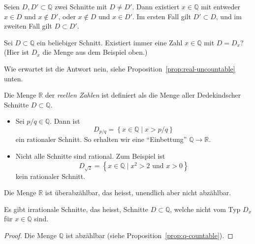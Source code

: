 \documentclass[../main.tex]{subfiles}
\begin{document}
\begin{remark}
  Seien $D, D' \subset \mathbb Q$ zwei Schnitte mit $D \neq D'$.
  Dann existiert $x \in \mathbb Q$ mit entweder $x \in D$ und $x \notin D'$,
  oder $x \notin D$ und $x \in D'$.
  Im ersten Fall gilt $D' \subset D$, und im zweiten Fall gilt $D \subset D'$.
\end{remark}

\begin{question}
  Sei $D \subset \mathbb Q$ ein beliebiger Schnitt. Existiert immer
  eine Zahl $x \in \mathbb Q$ mit $D = D_{x}$?
  (Hier ist $D_{x}$ die Menge aus dem Beispiel oben.)
\end{question}

Wie erwartet ist die Antwort nein, siehe Proposition~\ref{prop:real-uncountable} unten.


\begin{definition}
  Die Menge $\mathbb R$ der \emph{reellen Zahlen} ist definiert als die Menge
  aller Dedekindscher Schnitte $D \subset \mathbb Q$.
\end{definition}

\begin{examples}
  \leavevmode
  \begin{itemize}
    \item Sei $p/q \in \mathbb Q$. Dann ist
      \[ D_{p/q} = \left\{x \in \mathbb Q \mid x> p/q \right\}\]
      ein rationaler Schnitt. So erhalten wir eine ``Einbettung''
      $\mathbb Q \to \mathbb R$.
    \item Nicht alle Schnitte sind rational. Zum Beispiel ist
      \[D_{\sqrt 2} = \left\{x \in \mathbb Q \mid x^{2} > 2 \text{ und } x > 0\right\}\]
      kein rationaler Schnitt.
  \end{itemize}
\end{examples}

\begin{proposition}[Cantor]\label{prop:real-uncountable}
  Die Menge $\mathbb R$ ist überabzählbar, das heisst, unendlich
  aber nicht abzählbar.
\end{proposition}

\begin{corollary*}
  Es gibt irrationale Schnitte, das heisst, Schnitte $D \subset \mathbb Q$,
  welche nicht vom Typ $D_{x}$ für $x \in \mathbb Q$ sind.
\end{corollary*}

\begin{proof}
  Die Menge $\mathbb Q$ ist abzählbar (siehe Proposition~\ref{prop:q-countable}).
\end{proof}
\end{document}
